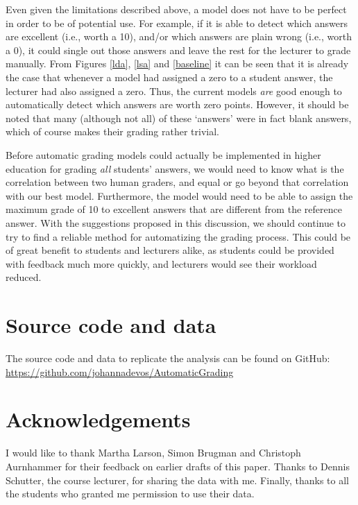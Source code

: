 \documentclass[a4paper,10pt,twoside]{article}
\begin{document}
Even given the limitations described above, a model does not have to be perfect in order to be of potential use. For example, if it is able to detect which answers are excellent (i.e., worth a 10), and/or which answers are plain wrong (i.e., worth a 0), it could single out those answers and leave the rest for the lecturer to grade manually. From Figures \ref{lda}, \ref{lsa} and \ref{baseline} it can be seen that it is already the case that whenever a model had assigned a zero to a student answer, the lecturer had also assigned a zero. Thus, the current models \textit{are} good enough to automatically detect which answers are worth zero points. However, it should be noted that many (although not all) of these `answers' were in fact blank answers, which of course makes their grading rather trivial. 

Before automatic grading models could actually be implemented in higher education for grading \textit{all} students' answers, we would need to know what is the correlation between two human graders, and equal or go beyond that correlation with our best model. Furthermore, the model would need to be able to assign the maximum grade of 10 to excellent answers that are different from the reference answer. With the suggestions proposed in this discussion, we should continue to try to find a reliable method for automatizing the grading process. This could be of great benefit to students and lecturers alike, as students could be provided with feedback much more quickly, and lecturers would see their workload reduced.

\section*{Source code and data}
The source code and data to replicate the analysis can be found on GitHub: \url{https://github.com/johannadevos/AutomaticGrading}

\section*{Acknowledgements} 
I would like to thank Martha Larson, Simon Brugman and Christoph Aurnhammer for their feedback on earlier drafts of this paper. Thanks to Dennis Schutter, the course lecturer, for sharing the data with me. Finally, thanks to all the students who granted me permission to use their data.

 
 
\end{document}
